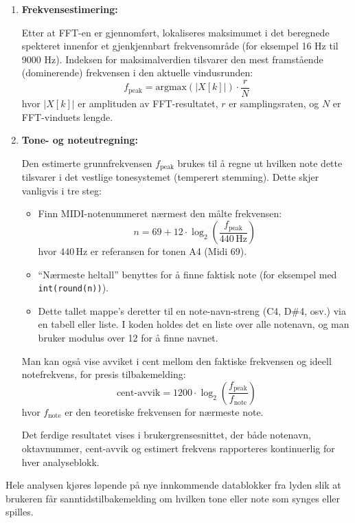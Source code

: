 \begin{enumerate}
    \item \textbf{Frekvensestimering:}
    
    Etter at FFT-en er gjennomført, lokaliseres maksimumet i det beregnede spekteret innenfor et gjenkjennbart frekvensområde (for eksempel 16 Hz til 9000 Hz). Indeksen for maksimalverdien tilsvarer den mest framstående (dominerende) frekvensen i den aktuelle vindusrunden:
    \[
        f_\text{peak} = \text{argmax}(|X[k]|) \cdot \frac{r}{N}
    \]
    hvor $|X[k]|$ er amplituden av FFT-resultatet, $r$ er samplingsraten, og $N$ er FFT-vinduets lengde.
    \item \textbf{Tone- og noteutregning:}
    
    Den estimerte grunnfrekvensen $f_\text{peak}$ brukes til å regne ut hvilken note dette tilsvarer i det vestlige tonesystemet (temperert stemming). Dette skjer vanligvis i tre steg:
    \begin{itemize}
        \item Finn MIDI-notenummeret nærmest den målte frekvensen:
        \[
        n = 69 + 12 \cdot \log_2\left(\frac{f_\text{peak}}{440\,\text{Hz}}\right)
        \]
        hvor $440\,\text{Hz}$ er referansen for tonen A4 (Midi 69).
        
        \item ``Nærmeste heltall'' benyttes for å finne faktisk note (for eksempel med \texttt{int(round(n))}).
        
        \item Dette tallet mappe's deretter til en note-navn-streng (C4, D\#4, osv.) via en tabell eller liste. I koden holdes det en liste over alle notenavn, og man bruker modulus over 12 for å finne navnet.
    \end{itemize}
    Man kan også vise avviket i cent mellom den faktiske frekvensen og ideell notefrekvens, for presis tilbakemelding:
    \[
      \text{cent-avvik} = 1200 \cdot \log_2 \left(\frac{f_\text{peak}}{f_\text{note}}\right)
    \]
    hvor $f_\text{note}$ er den teoretiske frekvensen for nærmeste note.

    Det ferdige resultatet vises i brukergrensesnittet, der både notenavn, oktavnummer, cent-avvik og estimert frekvens rapporteres kontinuerlig for hver analyseblokk.
\end{enumerate}

Hele analysen kjøres løpende på nye innkommende datablokker fra lyden slik at brukeren får sanntidstilbakemelding om hvilken tone eller note som synges eller spilles.




